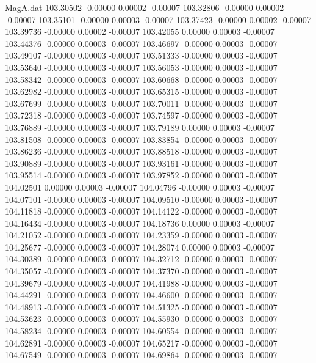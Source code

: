 \begin{filecontents}{MagA.dat}
 103.30502   -0.00000    0.00002   -0.00007
 103.32806   -0.00000    0.00002   -0.00007
 103.35101   -0.00000    0.00003   -0.00007
 103.37423   -0.00000    0.00002   -0.00007
 103.39736   -0.00000    0.00002   -0.00007
 103.42055    0.00000    0.00003   -0.00007
 103.44376   -0.00000    0.00003   -0.00007
 103.46697   -0.00000    0.00003   -0.00007
 103.49107   -0.00000    0.00003   -0.00007
 103.51333   -0.00000    0.00003   -0.00007
 103.53640   -0.00000    0.00003   -0.00007
 103.56053   -0.00000    0.00003   -0.00007
 103.58342   -0.00000    0.00003   -0.00007
 103.60668   -0.00000    0.00003   -0.00007
 103.62982   -0.00000    0.00003   -0.00007
 103.65315   -0.00000    0.00003   -0.00007
 103.67699   -0.00000    0.00003   -0.00007
 103.70011   -0.00000    0.00003   -0.00007
 103.72318   -0.00000    0.00003   -0.00007
 103.74597   -0.00000    0.00003   -0.00007
 103.76889   -0.00000    0.00003   -0.00007
 103.79189    0.00000    0.00003   -0.00007
 103.81508   -0.00000    0.00003   -0.00007
 103.83854   -0.00000    0.00003   -0.00007
 103.86236   -0.00000    0.00003   -0.00007
 103.88518   -0.00000    0.00003   -0.00007
 103.90889   -0.00000    0.00003   -0.00007
 103.93161   -0.00000    0.00003   -0.00007
 103.95514   -0.00000    0.00003   -0.00007
 103.97852   -0.00000    0.00003   -0.00007
 104.02501    0.00000    0.00003   -0.00007
 104.04796   -0.00000    0.00003   -0.00007
 104.07101   -0.00000    0.00003   -0.00007
 104.09510   -0.00000    0.00003   -0.00007
 104.11818   -0.00000    0.00003   -0.00007
 104.14122   -0.00000    0.00003   -0.00007
 104.16434   -0.00000    0.00003   -0.00007
 104.18736    0.00000    0.00003   -0.00007
 104.21052   -0.00000    0.00003   -0.00007
 104.23359   -0.00000    0.00003   -0.00007
 104.25677   -0.00000    0.00003   -0.00007
 104.28074    0.00000    0.00003   -0.00007
 104.30389   -0.00000    0.00003   -0.00007
 104.32712   -0.00000    0.00003   -0.00007
 104.35057   -0.00000    0.00003   -0.00007
 104.37370   -0.00000    0.00003   -0.00007
 104.39679   -0.00000    0.00003   -0.00007
 104.41988   -0.00000    0.00003   -0.00007
 104.44291   -0.00000    0.00003   -0.00007
 104.46600   -0.00000    0.00003   -0.00007
 104.48913   -0.00000    0.00003   -0.00007
 104.51325   -0.00000    0.00003   -0.00007
 104.53623   -0.00000    0.00003   -0.00007
 104.55930   -0.00000    0.00003   -0.00007
 104.58234   -0.00000    0.00003   -0.00007
 104.60554   -0.00000    0.00003   -0.00007
 104.62891   -0.00000    0.00003   -0.00007
 104.65217   -0.00000    0.00003   -0.00007
 104.67549   -0.00000    0.00003   -0.00007
 104.69864   -0.00000    0.00003   -0.00007

\end{filecontents}
